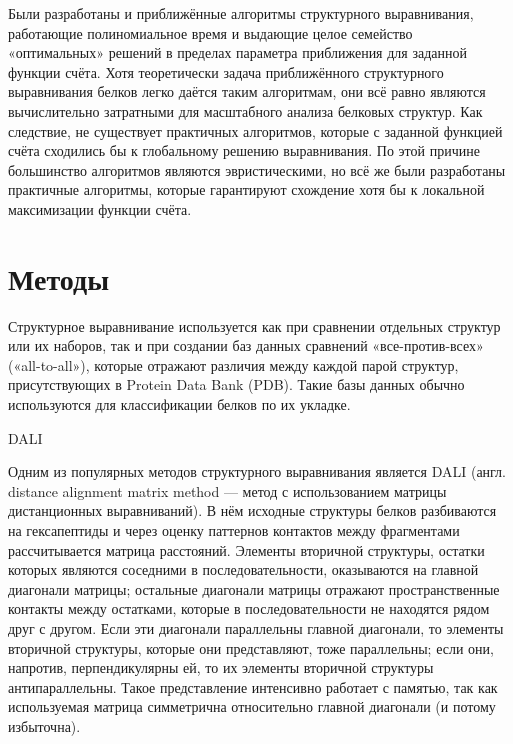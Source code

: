 \documentclass[a4paper]{extreport}
\begin{document}
Были разработаны и приближённые алгоритмы структурного выравнивания, работающие полиномиальное время и выдающие целое семейство «оптимальных» решений в пределах параметра приближения для заданной функции счёта. Хотя теоретически задача приближённого структурного выравнивания белков легко даётся таким алгоритмам, они всё равно являются вычислительно затратными для масштабного анализа белковых структур. Как следствие, не существует практичных алгоритмов, которые с заданной функцией счёта сходились бы к глобальному решению выравнивания. По этой причине большинство алгоритмов являются эвристическими, но всё же были разработаны практичные алгоритмы, которые гарантируют схождение хотя бы к локальной максимизации функции счёта. 

\section{Методы}

Структурное выравнивание используется как при сравнении отдельных структур или их наборов, так и при создании баз данных сравнений «все-против-всех» («all-to-all»), которые отражают различия между каждой парой структур, присутствующих в Protein Data Bank (PDB). Такие базы данных обычно используются для классификации белков по их укладке.

DALI

Одним из популярных методов структурного выравнивания является DALI (англ. distance alignment matrix method — метод с использованием матрицы дистанционных выравниваний). В нём исходные структуры белков разбиваются на гексапептиды и через оценку паттернов контактов между фрагментами рассчитывается матрица расстояний. Элементы вторичной структуры, остатки которых являются соседними в последовательности, оказываются на главной диагонали матрицы; остальные диагонали матрицы отражают пространственные контакты между остатками, которые в последовательности не находятся рядом друг с другом. Если эти диагонали параллельны главной диагонали, то элементы вторичной структуры, которые они представляют, тоже параллельны; если они, напротив, перпендикулярны ей, то их элементы вторичной структуры антипараллельны. Такое представление интенсивно работает с памятью, так как используемая матрица симметрична относительно главной диагонали (и потому избыточна).
\end{document}
